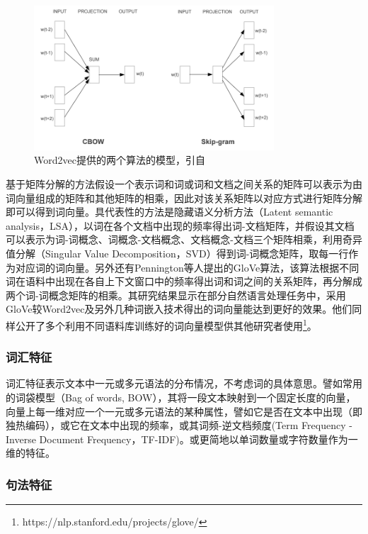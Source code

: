 \begin{figure}[H]
  \centering
  \includegraphics[width=0.8\textwidth]{img/word2vec.png}
  \caption{Word2vec提供的两个算法的模型，引自\cite{mikolov2013efficient}}
  \label{fig:word2vec}
\end{figure}

基于矩阵分解的方法假设一个表示词和词或词和文档之间关系的矩阵可以表示为由词向量组成的矩阵和其他矩阵的相乘，因此对该关系矩阵以对应方式进行矩阵分解即可以得到词向量。具代表性的方法是隐藏语义分析方法（Latent semantic analysis，LSA）\cite{deerwester1990indexing}，以词在各个文档中出现的频率得出词-文档矩阵，并假设其文档可以表示为词-词概念、词概念-文档概念、文档概念-文档三个矩阵相乘，利用奇异值分解（Singular Value Decomposition，SVD）得到词-词概念矩阵，取每一行作为对应词的词向量。另外还有Pennington等人\cite{pennington2014glove}提出的GloVe算法，该算法根据不同词在语料中出现在各自上下文窗口中的频率得出词和词之间的关系矩阵，再分解成两个词-词概念矩阵的相乘。其研究结果显示在部分自然语言处理任务中，采用GloVe较Word2vec及另外几种词嵌入技术得出的词向量能达到更好的效果。他们同样公开了多个利用不同语料库训练好的词向量模型供其他研究者使用\footnote{https://nlp.stanford.edu/projects/glove/}。

\subsubsection{词汇特征} %

词汇特征表示文本中一元或多元语法的分布情况，不考虑词的具体意思。譬如常用的词袋模型（Bag of words, BOW），其将一段文本映射到一个固定长度的向量，向量上每一维对应一个一元或多元语法的某种属性，譬如它是否在文本中出现（即独热编码），或它在文本中出现的频率，或其词频-逆文档频度(Term Frequency - Inverse Document Frequency，TF-IDF)。或更简地以单词数量或字符数量作为一维的特征。

\subsubsection{句法特征} %

